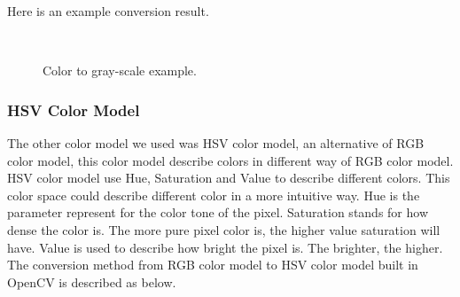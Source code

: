             Here is an example conversion result.
            \begin{figure}[H]
                \\
                \caption{Color to gray-scale example.}
                \label{fig:thresholding_Example}
            \end{figure}


        \subsubsection{HSV Color Model}
            The other color model we used was HSV color model, an alternative of RGB color model, this color model describe colors in different way of RGB color model.
            HSV color model use Hue, Saturation and Value to describe different colors.
            This color space could describe different color in a more intuitive way.
            Hue is the parameter represent for the color tone of the pixel. %
            Saturation stands for how dense the color is. The more pure pixel color is, the higher value saturation will have.
            Value is used to describe how bright the pixel is. The brighter, the higher.
            The conversion method from RGB color model to HSV color model built in OpenCV is described as below.

